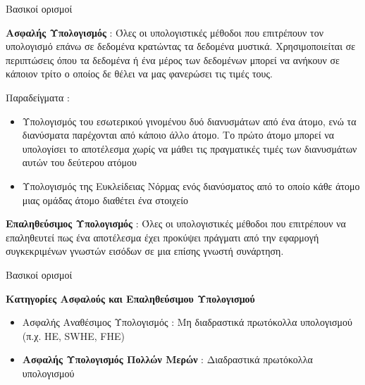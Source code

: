 \documentclass[10pt]{beamer}
\begin{document}
    \begin{frame}{Βασικοί ορισμοί}
        \begin{block}{}
            \textbf{Ασφαλής Υπολογισμός} : Όλες οι υπολογιστικές μέθοδοι που επιτρέπουν τον υπολογισμό επάνω σε δεδομένα κρατώντας τα δεδομένα μυστικά. Χρησιμοποιείται σε περιπτώσεις όπου τα δεδομένα ή ένα μέρος των δεδομένων μπορεί να ανήκουν σε κάποιον τρίτο ο οποίος δε θέλει να μας φανερώσει τις τιμές τους.
        \end{block}{}
        \begin{block}{}
            Παραδείγματα :
            \begin{itemize}
                \item Υπολογισμός του εσωτερικού γινομένου δυό διανυσμάτων από ένα άτομο, ενώ τα διανύσματα παρέχονται από κάποιο άλλο άτομο. Το πρώτο άτομο μπορεί να υπολογίσει το αποτέλεσμα χωρίς να μάθει τις πραγματικές τιμές των διανυσμάτων αυτών του δεύτερου ατόμου
                \item Υπολογισμός της Ευκλείδειας Νόρμας ενός διανύσματος από το οποίο κάθε άτομο μιας ομάδας άτομο διαθέτει ένα στοιχείο
            \end{itemize}
        \end{block}
        \begin{block}{}
            \textbf{Επαληθεύσιμος Υπολογισμός} : Όλες οι υπολογιστικές μέθοδοι που επιτρέπουν να επαληθευτεί πως ένα αποτέλεσμα έχει προκύψει πράγματι από την εφαρμογή συγκεκριμένων γνωστών εισόδων σε μια επίσης γνωστή συνάρτηση.
        \end{block}{}
    \end{frame}

    \begin{frame}{Βασικοί ορισμοί}
        \begin{block}{}
            \textbf{Κατηγορίες Ασφαλούς και Επαληθεύσιμου Υπολογισμού}
            \begin{itemize}
                \item Ασφαλής Αναθέσιμος Υπολογισμός : Μη διαδραστικά πρωτόκολλα υπολογισμού (π.χ. HE, SWHE, FHE)
                \item \textbf{Ασφαλής Υπολογισμός Πολλών Μερών} : Διαδραστικά πρωτόκολλα υπολογισμού
            \end{itemize}
        \end{block}
    \end{frame}
\end{document}
